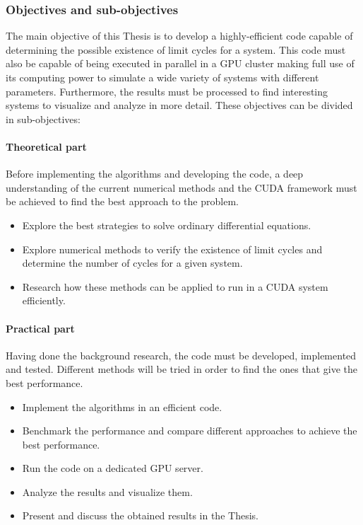 \subsubsection{Objectives and sub-objectives}

The main objective of this Thesis is to develop a highly-efficient code capable of determining the possible existence of limit cycles for a system. This code must also be capable of being executed in parallel in a GPU cluster making full use of its computing power to simulate a wide variety of systems with different parameters. Furthermore, the results must be processed to find interesting systems to visualize and analyze in more detail. These objectives can be divided in sub-objectives:

\paragraph{Theoretical part}

Before implementing the algorithms and developing the code, a deep understanding
of the current numerical methods and the CUDA framework must be achieved to find
the best approach to the problem.

\begin{itemize}
    \item Explore the best strategies to solve ordinary differential equations.
    \item Explore numerical methods to verify the existence of limit cycles and determine the number of cycles for a given system.
    \item Research how these methods can be applied to run in a CUDA system efficiently.
\end{itemize}

\paragraph{Practical part}

Having done the background research, the code must be developed, implemented and
tested.  Different methods will be tried in order to find the ones that give the
best performance.

\begin{itemize}
    \item Implement the algorithms in an efficient code.
    \item Benchmark the performance and compare different approaches to achieve the best performance.
    \item Run the code on a dedicated GPU server.
    \item Analyze the results and visualize them.
    \item Present and discuss the obtained results in the Thesis.
\end{itemize}

